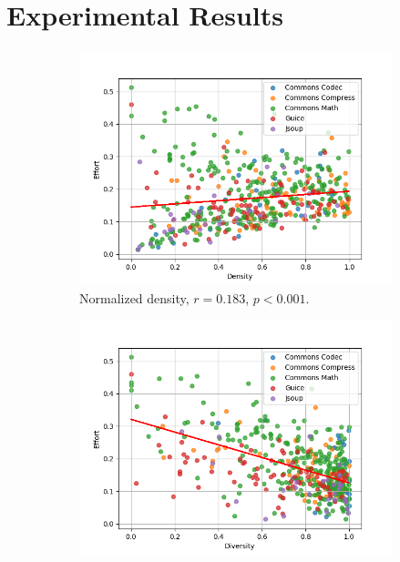 \documentclass[twoside,a4paper,11pt]{memoir}
\begin{document}
\section{Experimental Results}%
\label{sec:rq2_experimental_results}

\begin{figure}
    \centering
    \begin{subfigure}[b]{0.49\linewidth}
        \centering
        \includegraphics[width=\linewidth]{figures/effort_density}
        \caption{Normalized density, \(r = 0.183 \), \(p < 0.001 \).}%
        \label{fig:effort_density}
    \end{subfigure}
    \hfill
    \begin{subfigure}[b]{0.49\linewidth}
        \centering
        \includegraphics[width=\linewidth]{figures/effort_diversity}

\end{subfigure}
\end{figure}
\end{document}
